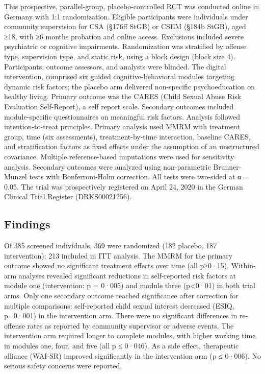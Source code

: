 \documentclass[
  super,
  preprint,
  1p,
  onecolumn]{elsarticle}
\begin{document}
This prospective, parallel-group, placebo-controlled RCT was conducted
online in Germany with 1:1 randomization. Eligible participants were
individuals under community supervision for CSA (§176ff StGB) or CSEM
(§184b StGB), aged ≥18, with ≥6 months probation and online access.
Exclusions included severe psychiatric or cognitive impairments.
Randomization was stratified by offense type, supervision type, and
static risk, using a block design (block size 4). Participants, outcome
assessors, and analysts were blinded. The digital intervention,
comprised six guided cognitive-behavioral modules targeting dynamic risk
factors; the placebo arm delivered non-specific psychoeducation on
healthy living. Primary outcome was the CARES (Child Sexual Abuse Risk
Evaluation Self-Report), a self report scale. Secondary outcomes
included module-specific questionnaires on meaningful risk factors.
Analysis followed intention-to-treat principles. Primary analysis used
MMRM with treatment group, time (six assessments), treatment-by-time
interaction, baseline CARES, and stratification factors as fixed effects
under the assumption of an unstructured covariance. Multiple
reference-based imputations were used for sensitivity analysis.
Secondary outcomes were analyzed using non-parametric Brunner-Munzel
tests with Bonferroni-Holm correction. All tests were two-sided at α =
0.05. The trial was prospectively registered on April 24, 2020 in the
German Clinical Trial Register (DRKS00021256).

\subsection*{Findings}\label{findings}

Of 385 screened individuals, 369 were randomized (182 placebo, 187
intervention); 213 included in ITT analysis. The MMRM for the primary
outcome showed no significant treatment effects over time (all p≥0·15).
Within-arm analyses revealed significant reductions in self-reported
risk factors at module one (intervention: p = 0·005) and module three
(p\textless0·01) in both trial arms. Only one secondary outcome reached
significance after correction for multiple comparisons: self-reported
child sexual interest decreased (ESIQ, p=0·001) in the intervention arm.
There were no significant differences in re-offense rates as reported by
community supervisor or adverse events. The intervention arm required
longer to complete modules, with higher working time in modules one,
four, and five (all p ≤ 0·046). As a side effect, therapeutic alliance
(WAI-SR) improved significantly in the intervention arm (p ≤ 0·006). No
serious safety concerns were reported.
\end{document}
